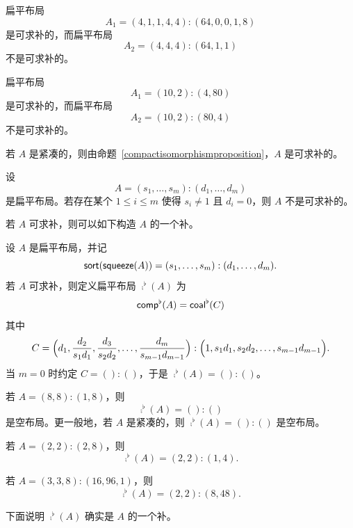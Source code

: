 \begin{example}
    扁平布局
    \[A_1 = (4,1,1,4,4):(64,0,0,1,8)\] 是可求补的，而扁平布局
    \[ A_2 = (4,4,4):(64,1,1)\] 不是可求补的。
\end{example}

\begin{example}
    扁平布局
    \[A_1 = (10,2):(4,80)\] 是可求补的，而扁平布局
    \[ A_2 = (10,2):(80,4)\] 不是可求补的。
\end{example}

\begin{example}
    若 $A$ 是紧凑的，则由命题~\ref{compactisomorphismproposition}，$A$ 是可求补的。
\end{example}

\begin{example}
    设
    \[A = (s_1,\dots,s_m):(d_1,\dots,d_m)\]
    是扁平布局。若存在某个 $1 \leq i \leq m$ 使得 $s_i \neq  1$ 且 $d_i = 0$，则 $A$ 不是可求补的。
\end{example}

若 $A$ 可求补，则可以如下构造 $A$ 的一个补。

\begin{construction}\label{complementconstruction}
    设 $A$ 是扁平布局，并记
    \[\mathsf{sort}(\mathsf{squeeze}(A)) = (s_1,\dots,s_m):(d_1,\dots,d_m).\]
    若 $A$ 可求补，则定义扁平布局 $\comp^\flat(A)$ 为
    \[
    \mathsf{comp}^\flat(A) = \mathsf{coal}^\flat(C)
    \]
    其中
    \[C = \Bigl(d_1 , \dfrac{d_2}{s_1d_1} , \dfrac{d_3}{s_2d_2} , \dots ,\dfrac{d_m}{s_{m-1}d_{m-1}} \Bigr) : \Bigl(1 , s_1d_1 , s_2d_2, \dots ,s_{m-1}d_{m-1}\Bigr).
    \]
    当 $m=0$ 时约定 $C=():()$，于是 $\comp^\flat(A)=():()$。
\end{construction}

\begin{example}
    若 $A = (8,8):(1,8)$，则
    \[\comp^\flat(A) = ():()\]
    是空布局。更一般地，若 $A$ 是紧凑的，则 $\comp^\flat(A) = ():() $ 是空布局。
\end{example}

\begin{example}
    若 $A = (2,2):(2,8)$，则 \[\comp^\flat(A) = (2,2):(1,4).\]
\end{example}

\begin{example}
    若 $A = (3,3,8):(16,96,1)$，则
    \[\comp^\flat(A) = (2,2):(8,48).\]
\end{example}

\noindent 下面说明 $\comp^\flat(A)$ 确实是 $A$ 的一个补。

